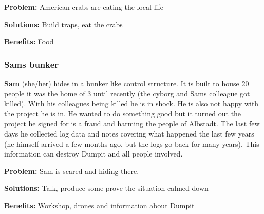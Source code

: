 
\textbf{Problem:} American crabs are eating the local life

\textbf{Solutions:} Build traps, eat the crabs

\textbf{Benefits:} Food

\subsubsection{Sams bunker}

\textbf{Sam} (she/her) hides in a bunker like control structure. It is built to house 20 people it was the home of 3 until recently (the cyborg and Sams colleague got killed). With his colleagues being killed he is in shock. He is also not happy with the project he is in. He wanted to do something good but it turned out the project he signed for is a fraud and harming the people of Albstadt. The last few days he collected log data and notes covering what happened the last few years (he himself arrived a few months ago, but the logs go back for many years). This information can destroy Dumpit and all people involved.

\textbf{Problem:} Sam is scared and hiding there.

\textbf{Solutions:} Talk, produce some prove the situation calmed down

\textbf{Benefits:} Workshop, drones and information about Dumpit


